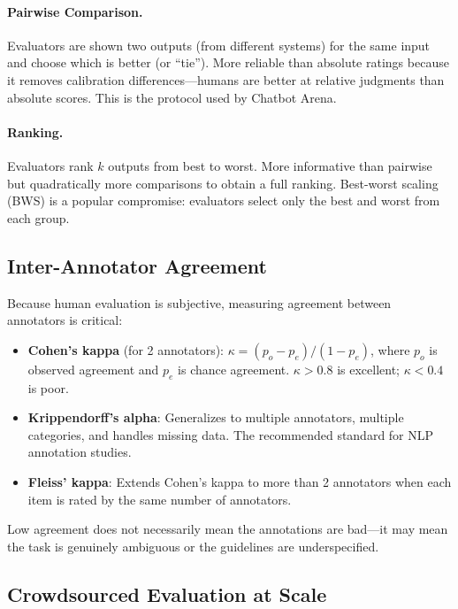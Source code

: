 \paragraph{Pairwise Comparison.}
Evaluators are shown two outputs (from different systems) for the same input and
choose which is better (or ``tie'').  More reliable than absolute ratings because
it removes calibration differences---humans are better at relative judgments than
absolute scores.  This is the protocol used by Chatbot Arena.

\paragraph{Ranking.}
Evaluators rank $k$ outputs from best to worst.  More informative than pairwise
but quadratically more comparisons to obtain a full ranking.  Best-worst scaling
(BWS) is a popular compromise: evaluators select only the best and worst from
each group.

\subsection{Inter-Annotator Agreement}

Because human evaluation is subjective, measuring agreement between annotators
is critical:
\begin{itemize}
    \item \textbf{Cohen's kappa} (for 2 annotators): $\kappa = (p_o - p_e) / (1 - p_e)$,
          where $p_o$ is observed agreement and $p_e$ is chance agreement.
          $\kappa > 0.8$ is excellent; $\kappa < 0.4$ is poor.
    \item \textbf{Krippendorff's alpha}: Generalizes to multiple annotators,
          multiple categories, and handles missing data.  The recommended
          standard for NLP annotation studies.
    \item \textbf{Fleiss' kappa}: Extends Cohen's kappa to more than 2
          annotators when each item is rated by the same number of annotators.
\end{itemize}

Low agreement does not necessarily mean the annotations are bad---it may mean
the task is genuinely ambiguous or the guidelines are underspecified.

\subsection{Crowdsourced Evaluation at Scale}

